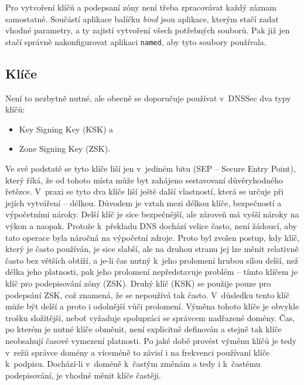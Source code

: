 Pro vytvoření klíčů a podepsaní zóny není třeba zpracovávat každý záznam samostatně. Součástí aplikace balíčku {\em bind} jsou aplikace, kterým stačí zadat vhodné parametry, a ty zajistí vytvoření všech potřebných souborů. Pak již jen stačí správně nakonfigurovat aplikaci {\tt named}, aby tyto soubory používala.

\subsection{Klíče}
Není to nezbytně nutné, ale obecně se doporučuje používat v~DNSSec dva typy klíčů:
\begin{itemize}
  \item Key Signing Key (KSK) a
  \item Zone Signing Key (ZSK).
\end{itemize}
Ve své podstatě se tyto klíče liší jen v~jediném bitu (SEP -- Secure Entry
Point), který říká, že od tohoto místa může byt zahájeno sestavovaní
důvěryhodného řetězce. V~praxi se tyto dva klíče liší ještě další vlastností,
která se určuje při jejích vytváření -- délkou. Důvodem je vztah mezi délkou
klíče, bezpečností a výpočetními nároky. Delší klíč je sice bezpečnější, ale
zároveň má vyšší nároky na výkon a naopak. Protože k~překladu DNS dochází velice
často, není žádoucí, aby tato operace byla náročná na výpočetní zdroje. Proto
byl zvolen postup, kdy klíč, který je často používán, je sice slabší, ale na
druhou stranu jej lze měnit relativně často bez větších obtíží, a je-li čas
nutný k~jeho prolomení hrubou sílou delší, než délka jeho platnosti, pak jeho prolomení nepředstavuje problém -- tímto klíčem je klíč pro podepisování zóny (ZSK). Druhý klíč (KSK) se použije pouze pro podepsání ZSK, což znamená, že se nepoužívá tak často. V~důsledku tento klíč může být delší a proto i odolnější vůči prolomení. Výměna tohoto klíče je obvykle trošku složitější, neboť vyžaduje spolupráci se správcem nadřazené domény. Čas, po kterém je nutné klíče obměnit, není explicitně definován a stejně tak klíče neobsahují časové vymezení platnosti. Po jaké době provést výměnu klíčů je tedy v~režii správce domény a víceméně to závisí i na frekvenci používaní klíče k~podpisu. Dochází-li v~doméně k~častým změnám a tedy i k~častému podepisování, je vhodné měnit klíče častěji.

